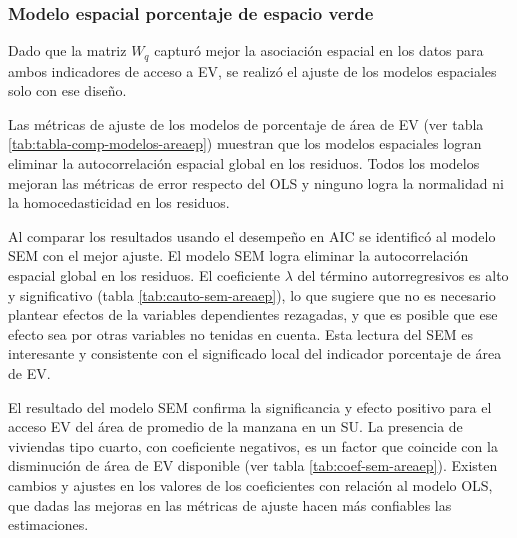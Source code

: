 \documentclass[12pt,a4paper,openany]{book}
\theoremstyle{definition}
\theoremstyle{definition}
\theoremstyle{definition}
\theoremstyle{remark}
\begin{document}
\subsubsection{Modelo espacial porcentaje de espacio
verde}\label{modelo-espacial-porcentaje-de-espacio-verde}

Dado que la matriz \(W_q\) capturó mejor la asociación espacial en los
datos para ambos indicadores de acceso a EV, se realizó el ajuste de los
modelos espaciales solo con ese diseño.

Las métricas de ajuste de los modelos de porcentaje de área de EV (ver
tabla \ref{tab:tabla-comp-modelos-areaep}) muestran que los modelos
espaciales logran eliminar la autocorrelación espacial global en los
residuos. Todos los modelos mejoran las métricas de error respecto del
OLS y ninguno logra la normalidad ni la homocedasticidad en los
residuos.

Al comparar los resultados usando el desempeño en AIC se identificó al
modelo SEM con el mejor ajuste. El modelo SEM logra eliminar la
autocorrelación espacial global en los residuos. El coeficiente
\(\lambda\) del término autorregresivos es alto y significativo (tabla
\ref{tab:cauto-sem-areaep}), lo que sugiere que no es necesario plantear
efectos de la variables dependientes rezagadas, y que es posible que ese
efecto sea por otras variables no tenidas en cuenta. Esta lectura del
SEM es interesante y consistente con el significado local del indicador
porcentaje de área de EV.

El resultado del modelo SEM confirma la significancia y efecto positivo
para el acceso EV del área de promedio de la manzana en un SU. La
presencia de viviendas tipo cuarto, con coeficiente negativos, es un
factor que coincide con la disminución de área de EV disponible (ver
tabla \ref{tab:coef-sem-areaep}). Existen cambios y ajustes en los
valores de los coeficientes con relación al modelo OLS, que dadas las
mejoras en las métricas de ajuste hacen más confiables las estimaciones.
\end{document}

